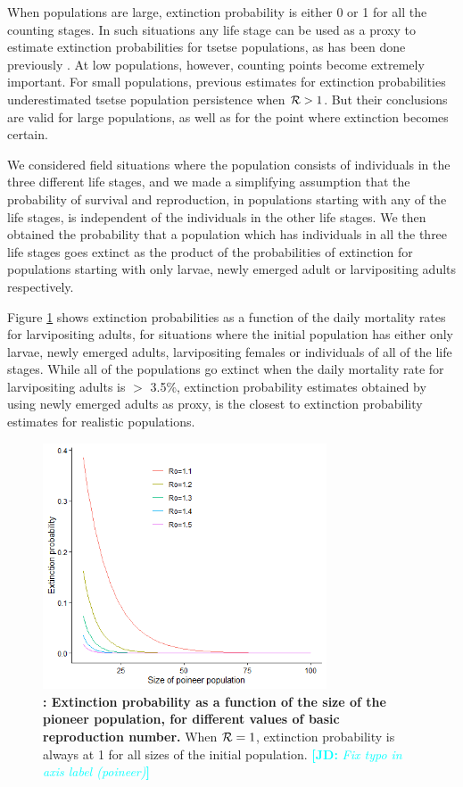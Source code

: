 \documentclass[smallextended]{svjour3}
\newcommand{\comment}[3]{\textcolor{#1}{\textbf{[#2: }\textit{#3}\textbf{]}}}
\newcommand{\jd}[1]{\comment{cyan}{JD}{#1}}
\begin{document}
When populations are large, extinction probability is either 0 or 1 for all the counting stages. In such situations any life stage can be used as a proxy to estimate extinction probabilities for tsetse populations, as has been done previously \cite{Hargrove2005a,Kajunguri2019}. At low populations, however, counting points become extremely important. For small populations, previous estimates for extinction probabilities underestimated tsetse population persistence when ${\cal R} > 1$. But their conclusions are valid for large populations, as well as for the point where extinction becomes certain.

We considered field situations where the population consists of individuals in the three different life stages, and we made a simplifying assumption that the probability of survival and reproduction, in populations starting with any of the life stages, is independent of the individuals in the other life stages. We then obtained the probability that a population which has individuals in all the three life stages goes extinct as the product of the probabilities of extinction for populations starting with only larvae, newly emerged adult or larvipositing adults respectively. 

Figure \ref{ExtPoineerSize} shows extinction probabilities as a function of the daily mortality rates for larvipositing adults, for situations where the initial population has either only larvae, newly emerged adults, larvipositing females or individuals of all of the life stages. While all of the populations go extinct when the daily mortality rate for larvipositing adults is $>$ 3.5\%, extinction probability estimates obtained by using newly emerged adults as proxy, is the closest to extinction probability estimates for realistic populations. 

\begin{figure}[h]
	\includegraphics[width=0.75\textwidth]{ExtinctionRepNumberPoineerPop.png}
	\caption{{\bf: Extinction probability as a function of the size of the pioneer population, for different values of basic reproduction number.} When ${\cal R}=1$, extinction probability is always at 1 for all sizes of the initial population.
	\jd{Fix typo in axis label (poineer)}
	}
	\label{ExtPoineerSize}
\end{figure}
\end{document}
